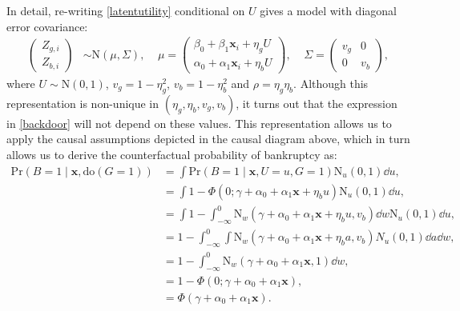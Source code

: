 \documentclass[aoas,preprint, 11pt, dvipsnames, table, x11name]{imsart}
\newcommand{\N}{\mbox{N}}
\theoremstyle{remark}
\begin{document}
	In detail, re-writing \autoref{latentutility} conditional on $U$ gives a model with diagonal error covariance:
	\begin{equation}
		\begin{split}
			\begin{pmatrix}
				Z_{g,i} \\ Z_{b,i}
			\end{pmatrix} &\sim \mbox{N}(\mu, \Sigma), \;\;\;\; 
			\mu  = \begin{pmatrix}
				\beta_{0} + \beta_{1}\mathbf{x}_i + \eta_g U  \\
				\alpha_{0} + \alpha_{1}\mathbf{x}_{i}  + \eta_b U
			\end{pmatrix},  \;\;\;\;  \Sigma = \begin{pmatrix} v_g & 0 \\ 0 & v_b \end{pmatrix},
		\end{split}
	\end{equation}
	where $U \sim \mbox{N}(0, 1)$, $v_g = 1 - \eta_g^2$, $v_b = 1 - \eta_b^2$ and $\rho = \eta_g \eta_b$.  Although this representation is non-unique in $(\eta_g, \eta_b, v_g, v_b)$, it turns out that the expression in \autoref{backdoor} will not depend on these values.  This representation allows us to apply the causal assumptions depicted in the causal diagram above, which in turn allows us to derive the counterfactual probability of bankruptcy as:
	\begin{equation}
		\begin{split}
			\mbox{Pr}(B = 1 \mid \mathbf{x}, \text{do}(G = 1)) &=  \int  \mbox{Pr}(B = 1 \mid \mathbf{x}, U=u, G = 1) \N_u(0,1) \dd u,\\
			& = \int  1 - \Phi(0; \gamma + \alpha_0 + \alpha_1 \mathbf{x} + \eta_b u) \N_u(0,1) \dd u,\\
			& = \int 1 - \int_{-\infty}^0 \N_w(\gamma + \alpha_0 + \alpha_1 \mathbf{x} + \eta_b u, v_b) \dd w \N_u(0,1) \dd u,\\
			& = 1 - \int_{-\infty}^0 \int \N_w(\gamma + \alpha_0 + \alpha_1 \mathbf{x} + \eta_b a, v_b)  N_u(0,1) \dd a \dd w,\\
			& = 1 - \int_{-\infty}^0 \N_w(\gamma + \alpha_0 + \alpha_1 \mathbf{x}, 1) \dd w,\\
			& = 1 - \Phi(0; \gamma + \alpha_0 + \alpha_1 \mathbf{x}),\\ 
			&= \Phi(\gamma + \alpha_0 + \alpha_1 \mathbf{x}).
		\end{split}
	\end{equation}
\end{document}
